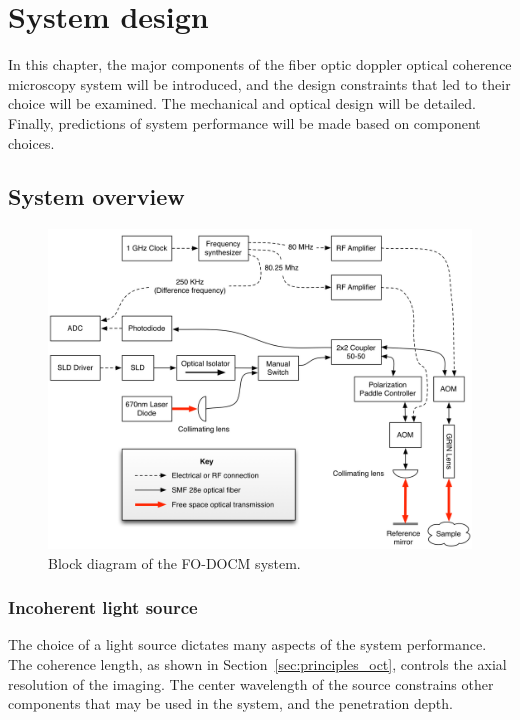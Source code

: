
\chapter{System design}

In this chapter, the major components of the fiber optic doppler optical coherence microscopy system will be introduced, and the design constraints that led to their choice will be examined. The mechanical and optical design will be detailed. Finally, predictions of system performance will be made based on component choices.

\section{System overview}

\begin{figure}[h!]
\centering
\includegraphics[width=1.0\textwidth]{Images/Background/actual_system_vertical.png}
\caption{Block diagram of the FO-DOCM system.}
\end{figure}

\subsection{Incoherent light source}

The choice of a light source dictates many aspects of the system performance. The coherence length, as shown in Section~\ref{sec:principles_oct}, controls the axial resolution of the imaging. The center wavelength of the source constrains other components that may be used in the system, and the penetration depth.

